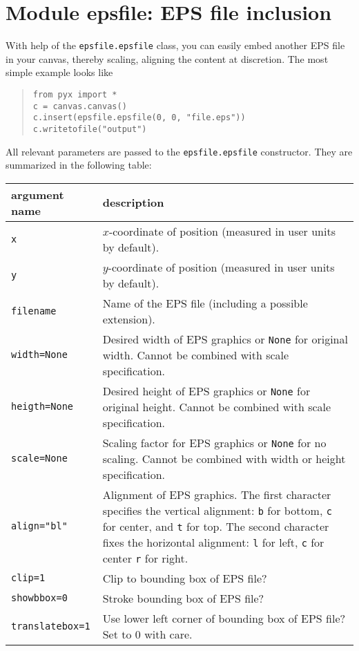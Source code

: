 \chapter{Module epsfile: EPS file inclusion}

With help of the \verb|epsfile.epsfile| class, you can easily embed
another EPS file in your canvas, thereby scaling, aligning the content
at discretion. The most simple example looks like
\begin{quote}
\begin{verbatim}
from pyx import *
c = canvas.canvas()
c.insert(epsfile.epsfile(0, 0, "file.eps"))
c.writetofile("output")
\end{verbatim}
\end{quote}

All relevant parameters are passed to the \verb|epsfile.epsfile|
constructor. They are summarized in the following table:

\medskip
\begin{tabularx}{\linewidth}{l>{\raggedright\arraybackslash}X}
argument name&description\\
\hline
\texttt{x} & $x$-coordinate of position (measured in user
units by default).\\
\texttt{y} & $y$-coordinate of position (measured in user
units by default).\\
\texttt{filename} & Name of the EPS file (including a possible
extension).\\
\texttt{width=None} & Desired width of EPS graphics or \texttt{None}
for original width. Cannot be combined with scale specification.\\
\texttt{heigth=None} & Desired height of EPS graphics or \texttt{None}
for original height. Cannot be combined with scale specification.\\
\texttt{scale=None} & Scaling factor for EPS graphics or \texttt{None}
for no scaling. Cannot be combined with width or height specification.\\
\texttt{align="bl"} & Alignment of EPS graphics. The first character
specifies the vertical alignment: \texttt{b} for bottom, \texttt{c}
for center, and \texttt{t} for top. The second character fixes the
horizontal alignment: \texttt{l} for left, \texttt{c} for center
\texttt{r} for right.\\
\texttt{clip=1} & Clip to bounding box of EPS file?\\
\texttt{showbbox=0} & Stroke bounding box of EPS file?\\
\texttt{translatebox=1} & Use lower left corner of bounding box of EPS
file? Set to $0$ with care.
\end{tabularx}



\label{epsfile}


